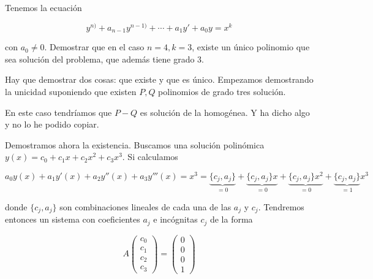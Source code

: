 \begin{example}[Ejercicio 8] Tenemos la ecuación

\[ y^{n)} + a_{n-1}y^{n-1)} + \dotsb + a_1y' + a_0y = x^k \]

con $a_0≠0$. Demostrar que en el caso $n=4,k=3$, existe un único polinomio que sea solución del problema, que además tiene grado 3.

Hay que demostrar dos cosas: que existe y que es único. Empezamos demostrando la unicidad suponiendo que existen $P,Q$ polinomios de grado tres solución.

En este caso tendríamos que $P-Q$ es solución de la homogénea. Y ha dicho algo y no lo he podido copiar.

Demostramos ahora la existencia. Buscamos una solución polinómica $y(x) = c_0+c_1x + c_2x^2 + c_3x^3$. Si calculamos

\[ a_0y(x) + a_1y'(x) + a_2y''(x) + a_3y'''(x) = x^3 = \underbrace{\{c_j,a_j\}}_{=0} + \underbrace{\{c_j,a_j\}x}_{=0} + \underbrace{\{c_j,a_j\}x^2}_{=0} + \underbrace{\{c_j,a_j\}}_{=1}x^3 \]

donde $\{c_j,a_j\}$ son combinaciones lineales de cada una de las $a_j$ y $c_j$. Tendremos entonces un sistema con coeficientes $a_j$ e incógnitas $c_j$ de la forma

\[ A \begin{pmatrix}
c_0 \\ c_1 \\ c_2 \\ c_3
\end{pmatrix} = \begin{pmatrix}
0 \\ 0 \\ 0 \\ 1
\end{pmatrix} \]
\end{example}

